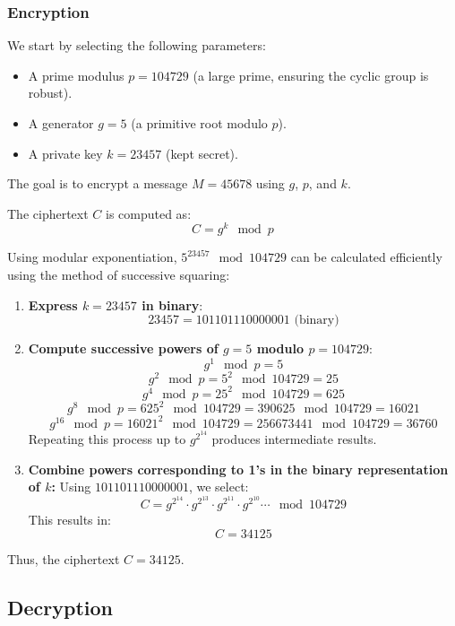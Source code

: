 \documentclass[12pt]{article}
\begin{document}
\subsubsection*{Encryption}

We start by selecting the following parameters:
\begin{itemize}
    \item A prime modulus \( p = 104729 \) (a large prime, ensuring the cyclic group is robust).
    \item A generator \( g = 5 \) (a primitive root modulo \( p \)).
    \item A private key \( k = 23457 \) (kept secret).
\end{itemize}

The goal is to encrypt a message \( M = 45678 \) using \( g \), \( p \), and \( k \).

The ciphertext \( C \) is computed as:
\[
C = g^k \mod p
\]

Using modular exponentiation, \( 5^{23457} \mod 104729 \) can be calculated efficiently using the method of successive squaring:

\begin{enumerate}
    \item \textbf{Express \( k = 23457 \) in binary}:
    \[
    23457 = 101101110000001 \text{ (binary)}
    \]

    \item \textbf{Compute successive powers of \( g = 5 \) modulo \( p = 104729 \)}:
    \[
    g^1 \mod p = 5
    \]
    \[
    g^2 \mod p = 5^2 \mod 104729 = 25
    \]
    \[
    g^4 \mod p = 25^2 \mod 104729 = 625
    \]
    \[
    g^8 \mod p = 625^2 \mod 104729 = 390625 \mod 104729 = 16021
    \]
    \[
    g^{16} \mod p = 16021^2 \mod 104729 = 256673441 \mod 104729 = 36760
    \]
    Repeating this process up to \( g^{2^{14}} \) produces intermediate results.

    \item \textbf{Combine powers corresponding to 1's in the binary representation of \( k \):}
    Using \( 101101110000001 \), we select:
    \[
    C = g^{2^{14}} \cdot g^{2^{13}} \cdot g^{2^{11}} \cdot g^{2^{10}} \cdots \mod 104729
    \]
    This results in:
    \[
    C = 34125
    \]
\end{enumerate}

Thus, the ciphertext \( C = 34125 \).

\subsection*{Decryption}
\end{document}
